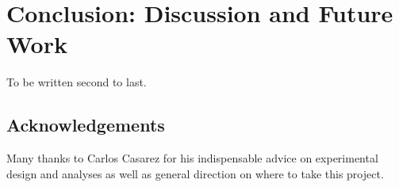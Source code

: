 \documentclass[letterpaper]{report}
\begin{document}
\chapter{Conclusion: Discussion and Future Work}
To be written second to last.

\section{Acknowledgements}
Many thanks to Carlos Casarez for his indispensable advice on experimental design and analyses as well as general direction on where to take this project.



\end{document}
